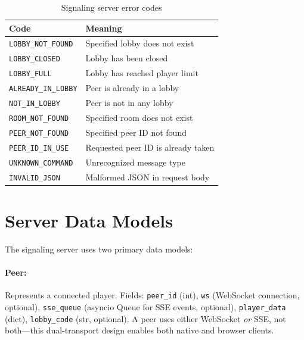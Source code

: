 \begin{table}[htbp]
    \centering
    \caption{Signaling server error codes}
    \begin{tabular}{@{}lp{9cm}@{}}
        \toprule
        \textbf{Code}               & \textbf{Meaning}                   \\
        \midrule
        \texttt{LOBBY\_NOT\_FOUND}  & Specified lobby does not exist     \\
        \texttt{LOBBY\_CLOSED}      & Lobby has been closed              \\
        \texttt{LOBBY\_FULL}        & Lobby has reached player limit     \\
        \texttt{ALREADY\_IN\_LOBBY} & Peer is already in a lobby         \\
        \texttt{NOT\_IN\_LOBBY}     & Peer is not in any lobby           \\
        \texttt{ROOM\_NOT\_FOUND}   & Specified room does not exist      \\
        \texttt{PEER\_NOT\_FOUND}   & Specified peer ID not found        \\
        \texttt{PEER\_ID\_IN\_USE}  & Requested peer ID is already taken \\
        \texttt{UNKNOWN\_COMMAND}   & Unrecognized message type          \\
        \texttt{INVALID\_JSON}      & Malformed JSON in request body     \\
        \bottomrule
    \end{tabular}
\end{table}

\section{Server Data Models}
\label{app:c:server-models}

The signaling server uses two primary data models:

\paragraph*{Peer:} Represents a connected player. Fields: \texttt{peer\_id} (int), \texttt{ws} (WebSocket connection, optional), \texttt{sse\_queue} (asyncio Queue for SSE events, optional), \texttt{player\_data} (dict), \texttt{lobby\_code} (str, optional). A peer uses either WebSocket \emph{or} SSE, not both---this dual-transport design enables both native and browser clients.


